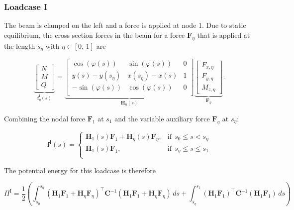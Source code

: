 \subsubsection*{Loadcase I}

The beam is clamped on the left and a force is applied at node 1.
Due to static equilibrium, the cross section forces in the beam for a force $\boldsymbol{F}_\eta$ that is applied at the length $s_\eta$ with $\eta \in [0,\,1]$ are

\begin{equation}
\underbrace{
\begin{bmatrix}
N \\ M \\ Q
\end{bmatrix}
}_{\boldsymbol{f}^{\mathrm{I}}_{\eta}(s)}
=
\underbrace{
\begin{bmatrix}
\cos(\varphi(s)) & \sin(\varphi(s)) & 0 \\
y(s) - y(s_\eta) & x(s_\eta) - x(s) & 1 \\
-\sin(\varphi(s)) & \cos(\varphi(s)) & 0 \\
\end{bmatrix}
}_{\boldsymbol{H}_{\eta}(s)}
\underbrace{
\begin{bmatrix}
F_{x,\eta} \\ F_{y,\eta} \\ M_{z,\eta}
\end{bmatrix}
}_{\boldsymbol{F}_\eta}. \label{eq:section-static-equilibrium}
\end{equation}

Combining the nodal force $\boldsymbol{F}_1$ at $s_1$ and the variable auxiliary force $\boldsymbol{F}_\eta$ at $s_\eta$:

\begin{equation}
\boldsymbol{f}^{\mathrm{I}}(s) = \begin{cases}
\boldsymbol{H}_{1}(s)\boldsymbol{F}_1 + \boldsymbol{H}_{\eta}(s)\boldsymbol{F}_\eta, & \text{if}\ \ s_0 \le s < s_\eta \\
\boldsymbol{H}_{1}(s)\boldsymbol{F}_1, & \text{if}\ \ s_\eta \le s \le s_1 \\
\end{cases}
\end{equation}

The potential energy for this loadcase is therefore

\begin{equation}
\Pi^{\mathrm{I}} = \frac{1}{2}\left(\int_{s_0}^{s_\eta} \left(\boldsymbol{H}_{1}\boldsymbol{F}_1 + \boldsymbol{H}_{\eta}\boldsymbol{F}_\eta\right)^\intercal\boldsymbol{C}^{-1}\left(\boldsymbol{H}_{1}\boldsymbol{F}_1 + \boldsymbol{H}_{\eta}\boldsymbol{F}_\eta\right)\,ds + \int_{s_\eta}^{s_1} \left(\boldsymbol{H}_{1}\boldsymbol{F}_1\right)^\intercal\boldsymbol{C}^{-1}\left(\boldsymbol{H}_{1}\boldsymbol{F}_1\right)\,ds\right)
\end{equation}

